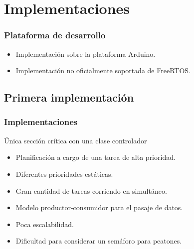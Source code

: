 \section{Implementaciones}

\begin{frame}
\frametitle{Plataforma de desarrollo}
\begin{block}{}
	\begin{itemize}
		\item Implementación sobre la plataforma Arduino.
		\item Implementación no oficialmente soportada de FreeRTOS.%

	\end{itemize}
\end{block}
\end{frame}
\subsection{Primera implementación}

\begin{frame}
\frametitle{Implementaciones}
\begin{block}{Única sección crítica con una clase controlador}
	\begin{itemize}
		\item Planificación a cargo de una tarea de alta prioridad.
		\item Diferentes prioridades estáticas.
		\item Gran cantidad de tareas corriendo en simultáneo.
		\item Modelo productor-consumidor para el pasaje de datos.
		\item Poca escalabilidad.
		\item Dificultad para considerar un semáforo para peatones.
	\end{itemize}
\end{block}
\end{frame}

